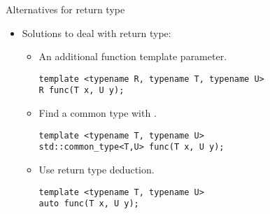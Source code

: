 \begin{frame}[t,fragile]{Alternatives for return type}
\begin{itemize}
  \item Solutions to deal with return type:
    \begin{itemize}
      \item An additional function template parameter.
\begin{lstlisting}
template <typename R, typename T, typename U>
R func(T x, U y);
\end{lstlisting}

      \item Find a common type with .
\begin{lstlisting}
template <typename T, typename U>
std::common_type<T,U> func(T x, U y);
\end{lstlisting}

      \item Use return type deduction.
\begin{lstlisting}
template <typename T, typename U>
auto func(T x, U y);
\end{lstlisting}

    \end{itemize}
\end{itemize}
\end{frame}
